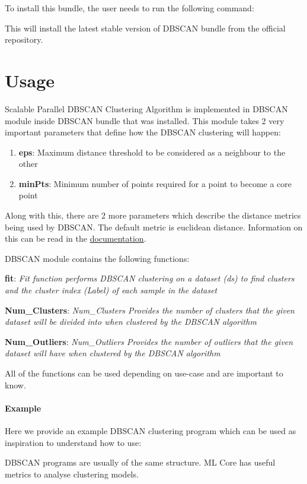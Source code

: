 To install this bundle, the user needs to run the following command:



This will install the latest stable version of DBSCAN bundle from the official repository.

\section{Usage}

Scalable Parallel DBSCAN Clustering Algorithm is implemented in DBSCAN module inside DBSCAN bundle that was installed. This module takes 2 very important parameters that define how the DBSCAN clustering will happen: 

\begin{enumerate}
    \item \textbf{eps}: Maximum distance threshold to be considered as a neighbour to the other
    \item \textbf{minPts}: Minimum number of points required for a point to become a core point
\end{enumerate}

Along with this, there are 2 more parameters which describe the distance metrics being used by DBSCAN. The default metric is euclidean distance. Information on this can be read in the \href{https://cdn.hpccsystems.com/pdf/ml/dbscan.pdf}{documentation}.

DBSCAN module contains the following functions:

\textbf{fit}: \textit{Fit function performs DBSCAN clustering on a dataset (ds) to find clusters and the cluster index (Label) of each sample in the dataset}

\textbf{Num\_Clusters}: \textit{Num\_Clusters Provides the number of clusters that the given dataset will be divided into when clustered by the DBSCAN algorithm}

\textbf{Num\_Outliers}: \textit{Num\_Outliers Provides the number of outliers that the given dataset will have when clustered by the DBSCAN algorithm}

All of the functions can be used depending on use-case and are important to know.

\paragraph{Example}

Here we provide an example DBSCAN clustering program which can be used as inspiration to understand how to use:



DBSCAN programs are usually of the same structure. ML Core has useful metrics to analyse clustering models.